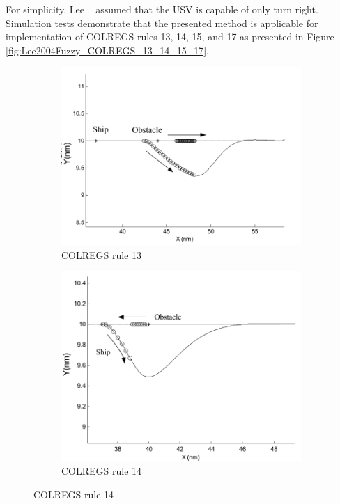     For simplicity, Lee \etal~\cite{Lee2004Fuzzy} assumed that the \ac{USV} is capable of only turn right. Simulation tests demonstrate that the presented method is applicable for implementation of \ac{COLREGS} rules 13, 14, 15, and 17 as presented in Figure \ref{fig:Lee2004Fuzzy_COLREGS_13_14_15_17}. 
    \begin{figure}[H]
    \centering
    
        \begin{subfigure}[b]{0.5\textwidth}
            \centering
            \includegraphics[width=\textwidth]{figs/Chap3/Lee2004Fuzzy_COLREGS13.png}
            \caption{\ac{COLREGS} rule 13}
            \label{fig:Lee2004Fuzzy_COLREGS13}
        \end{subfigure}
        \begin{subfigure}[b]{0.45\textwidth}
            \centering
            \includegraphics[width=\textwidth]{figs/Chap3/Lee2004Fuzzy_COLREGS14.png}
            \caption{\ac{COLREGS} rule 14}
            \label{fig:Lee2004Fuzzy_COLREGS14}
        \end{subfigure}
        

\end{figure}
